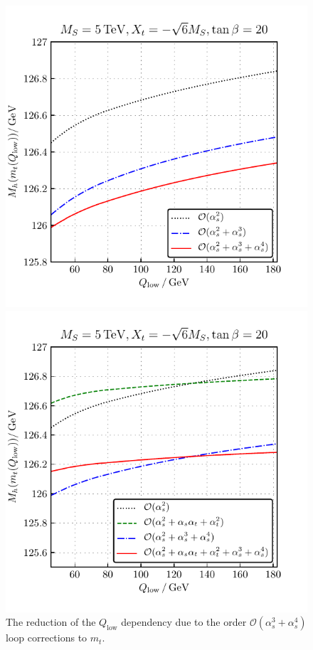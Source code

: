 \documentclass[a4paper,12pt]{book}
\begin{document}
\begin{figure}[h]
\begin{minipage}[t]{0.5\textwidth}
\includegraphics[width=\linewidth]{src/img/Mh_Qlow_mt3L4LQCD.pdf}
\captionsetup{width=.8\textwidth}
\caption{The reduction of the $Q_\text{low}$ dependency due to the order $\mathcal{O}(\alpha_s^3+\alpha_s^4)$ loop corrections to $m_t$.}
\label{fig::Mh_Qlow_mt3L4LQCD}
\end{minipage}
\begin{minipage}[t]{0.5\textwidth}
\includegraphics[width=\linewidth]{src/img/Mh_Qlow_full.pdf}

\end{minipage}
\end{figure}
\end{document}
